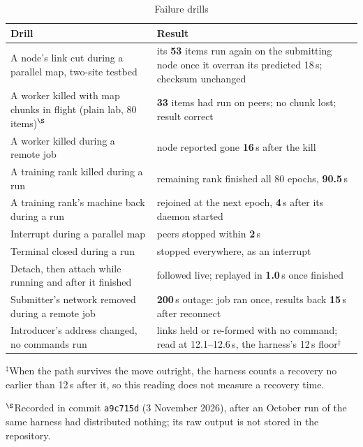 \begin{table}[!htbp]
\centering
\caption{Failure drills}
\label{tab:drills}
\renewcommand{\arraystretch}{1.2}
\begin{tabularx}{\textwidth}{X C{5.2cm}}
\toprule
\textbf{Drill} & \textbf{Result} \\
\midrule
A node's link cut during a parallel map, two-site testbed & its \textbf{53} items run again on the submitting node once it overran its predicted 18\,s; checksum unchanged \\
A worker killed with map chunks in flight (plain lab, 80 items)$^{\S}$ & \textbf{33} items had run on peers; no chunk lost; result correct \\
A worker killed during a remote job & node reported gone \textbf{16}\,s after the kill \\
A training rank killed during a run & remaining rank finished all 80 epochs, \textbf{90.5}\,s \\
A training rank's machine back during a run & rejoined at the next epoch, \textbf{4}\,s after its daemon started \\
Interrupt during a parallel map & peers stopped within \textbf{2}\,s \\
Terminal closed during a run & stopped everywhere, as an interrupt \\
Detach, then attach while running and after it finished & followed live; replayed in \textbf{1.0}\,s once finished \\
Submitter's network removed during a remote job & \textbf{200}\,s outage: job ran once, results back \textbf{15}\,s after reconnect \\
Introducer's address changed, no commands run & links held or re-formed with no command; read at 12.1--12.6\,s, the harness's 12\,s floor$^{\ddagger}$ \\
\bottomrule
\end{tabularx}

\smallskip
\raggedright\footnotesize $^{\ddagger}$When the path survives the move outright, the harness counts a
recovery no earlier than 12\,s after it, so this reading does not measure a recovery time.
\par $^{\S}$Recorded in commit \texttt{a9c715d} (3 November 2026), after an October run of
the same harness had distributed nothing; its raw output is not stored in the repository.
\end{table}

